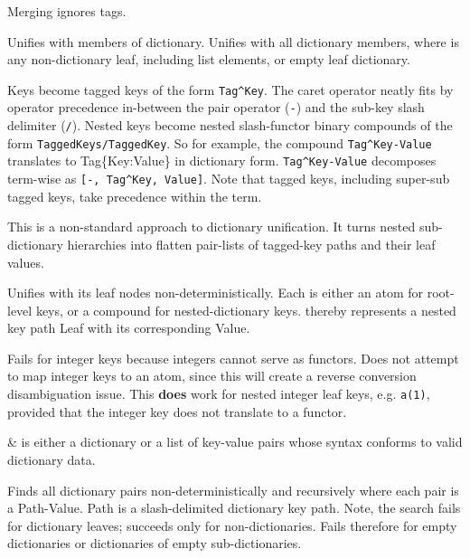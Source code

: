 \begin{description}
Merging ignores tags.

Unifies with members of dictionary. Unifies  with all
dictionary members, where  is any non-dictionary leaf,
including list elements, or empty leaf dictionary.

Keys become tagged keys of the form \verb$Tag^Key$. The caret operator
neatly fits by operator precedence in-between the pair operator
(\verb$-$) and the sub-key slash delimiter (\verb$/$). Nested keys become
nested slash-functor binary compounds of the form
\verb$TaggedKeys/TaggedKey$. So for example, the compound \verb$Tag^Key-Value$
translates to Tag\{Key:Value\} in dictionary form. \verb$Tag^Key-Value$
decomposes term-wise as \verb$[-, Tag^Key, Value]$. Note that tagged
keys, including super-sub tagged keys, take precedence within the
term.

This is a non-standard approach to dictionary unification. It turns
nested sub-dictionary hierarchies into flatten pair-lists of
tagged-key paths and their leaf values.

\nodescription
Unifies  with its leaf nodes non-deterministically. Each  is
either an atom for root-level keys, or a compound for
nested-dictionary keys.  thereby represents a nested key path
Leaf with its corresponding Value.

Fails for integer keys because integers cannot serve as functors.
Does not attempt to map integer keys to an atom, since this will
create a reverse conversion disambiguation issue. This \textbf{does} work
for nested integer leaf keys, e.g. \verb$a(1)$, provided that the integer
key does not translate to a functor.

\begin{arguments}
 & is either a dictionary or a list of key-value pairs whose
syntax conforms to valid dictionary data. \\
\end{arguments}

\nodescription
Finds all dictionary pairs non-deterministically and recursively
where each pair is a Path-Value. Path is a slash-delimited
dictionary key path. Note, the search fails for dictionary leaves;
succeeds only for non-dictionaries. Fails therefore for empty
dictionaries or dictionaries of empty sub-dictionaries.


\end{description}
